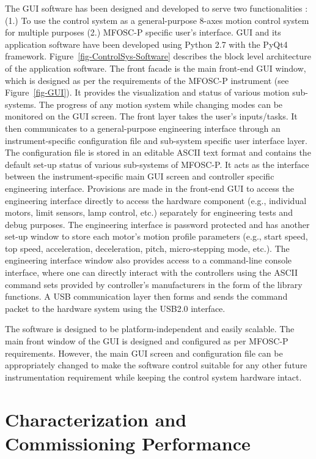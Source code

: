 The GUI software has been designed and developed to serve two functionalities : (1.) To use the control system as a general-purpose 8-axes motion control system for multiple purposes (2.) MFOSC-P specific user's interface. GUI and its application software have been developed using Python 2.7 with the PyQt4 framework. Figure~\ref{fig-ControlSys-Software} describes the block level architecture of the application software. The front facade is the main front-end GUI window, which is designed as per the requirements of the MFOSC-P instrument (see Figure~\ref{fig-GUI}). It provides the visualization and status of various motion sub-systems. The progress of any motion system while changing modes can be monitored on the GUI screen. The front layer takes the user's inputs/tasks. It then communicates to a general-purpose engineering interface through an instrument-specific configuration file and sub-system specific user interface layer. The configuration file is stored in an editable ASCII text format and contains the default set-up status of various sub-systems of MFOSC-P. It acts as the interface between the instrument-specific main GUI screen and controller specific engineering interface. Provisions are made in the front-end GUI to access the engineering interface directly to access the hardware component (e.g., individual motors, limit sensors, lamp control, etc.) separately for engineering tests and debug purposes. The engineering interface is password protected and has another set-up window to store each motor's motion profile parameters (e.g., start speed, top speed, acceleration, deceleration, pitch, micro-stepping mode, etc.). The engineering interface window also provides access to a command-line console interface, where one can directly interact with the controllers using the ASCII command sets provided by controller's manufacturers in the form of the library functions. A USB communication layer then forms and sends the command packet to the hardware system using the USB2.0 interface.
\par
The software is designed to be platform-independent and easily scalable. The main front window of the GUI is designed and configured as per MFOSC-P requirements. However, the main GUI screen and configuration file can be appropriately changed to make the software control suitable for any other future instrumentation requirement while keeping the control system hardware intact. \\

\par 
\section{Characterization and Commissioning Performance} 
\label{sec-Charactrization}
\par 

